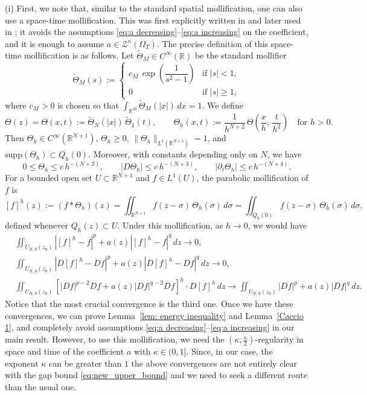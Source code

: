 \documentclass[notitlepage,11pt,reqno]{amsart}
\theoremstyle{definition}
\numberwithin{equation}{section}
\newcommand{\RR}{\mathds{R}}
\begin{document}
(i) First, we note that, similar to the standard spatial mollification, one can also use a space-time mollification. This was first explicitly written in \cite{OSS2025} and later used in \cite{HOK25, kimkimoh2026}; 
it avoids the assumptions \eqref{eq:a decreasing}--\eqref{eq:a increasing} on the coefficient, 
and it is enough to assume $a\in \mathcal{Z}^{\kappa}(\Omega_T)$. The precise definition of this space-time mollification is as follows. Let $\widetilde{\Theta}_M \in C^\infty(\RR)$ be the 
standard mollifier
\[
  \widetilde{\Theta}_M(s) :=
  \begin{cases}
    c_M\, \exp\!\left(\dfrac{1}{s^{2} - 1}\right) & \text{if } |s| < 1,\\[2mm]
    0 & \text{if } |s| \ge 1,
  \end{cases}
\]
where $c_M > 0$ is chosen so that
$\int_{\RR^M} \widetilde{\Theta}_M(|x|)\, dx = 1$. We define
\[
  \Theta(z) = \Theta(x, t)
        := \widetilde{\Theta}_N(|x|)\, \widetilde{\Theta}_1(t),
  \qquad
  \Theta_h(x, t)
        := \frac{1}{h^{N+2}}\, \Theta\!\left(\frac{x}{h},\, \frac{t}{h^{2}}\right)
  \quad \text{for } h > 0.
\]
Then $\Theta_h \in C^\infty(\RR^{N+1})$, $\Theta_h \ge 0$,
$\|\Theta_h\|_{L^1(\RR^{N+1})} = 1$, and
$\mathrm{supp}(\Theta_h) \subset Q_h(0)$. Moreover, with constants
depending only on $N$, we have
\[
  0 \le \Theta_h \le c\, h^{-(N+2)},
  \qquad
  |D\Theta_h| \le c\, h^{-(N+3)},
  \qquad
  |\partial_t \Theta_h| \le c\, h^{-(N+4)}.
\]
For a bounded open set $U \subset \RR^{N+1}$ and $f \in L^1(U)$, the
parabolic mollification of $f$ is
\[
  [f]^{h}(z)
  := (f * \Theta_h)(z)
  = \iint_{\RR^{N+1}} f(z - \sigma)\, \Theta_h(\sigma)\, d\sigma
  = \iint_{Q_h(0)} f(z - \sigma)\, \Theta_h(\sigma)\, d\sigma,
\]
defined whenever $Q_h(z) \subset U$. Under this mollification, as 
$h \to 0$, we would have
\begin{align*}
    &\iint_{U_{R, S}(z_0)}|[f]^h-f|^p+a(z)|[f]^h-f|^q\, dz\to 0,\\
    &\iint_{U_{R, S}(z_0)}|D[f]^h-Df|^p+a(z)|D[f]^h-Df|^q\, dz\to 0, \\
    &\iint_{U_{R, S}(z_0)}\left[|Df|^{p-2}Df+a(z)|Df|^{q-2}Df\right]^h\cdot D[f]^h\,dz\to \iint_{U_{R, S}(z_0)}|Df|^p+a(z)|Df|^q\,dz.
\end{align*}
Notice that the most crucial convergence is the third one. Once we 
have these convergences, we can prove 
Lemma~\ref{lem: energy inequality} and Lemma~\ref{Caccio 1}, and 
completely avoid assumptions  \eqref{eq:a decreasing}--\eqref{eq:a increasing} in our main result. However, to use this mollification, we need the  $(\kappa, \frac{\kappa}{2} )$-regularity in space and time of the coefficient $a$ with  $\kappa \in (0, 1].$ Since, in our case, the exponent $\kappa$ can be greater than $1$ the above convergences are not entirely clear with the gap bound \eqref{eq:new_upper_bound} and we need to seek a different route than the usual one.
\end{document}
